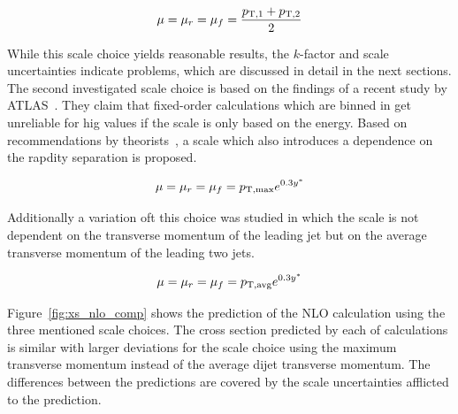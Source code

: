 \begin{equation*}
    \mu = \mu_r = \mu_f = \frac{p_{\mathrm{T},1} + p_{\mathrm{T},2}}{2}
\end{equation*}

While this scale choice yields reasonable results, the $k$-factor and scale
uncertainties indicate problems, which are discussed in detail
in the next sections. The second investigated scale choice is based on the
findings of a recent study by ATLAS~\cite{Aad:2011fc}. They claim that
fixed-order calculations which are binned in \ystar get unreliable for hig
\ystar values if the scale is only based on the energy. Based on recommendations
by theorists~\cite{Ellis:1992en}, a scale which also introduces a dependence on
the rapdity separation is proposed.

\begin{equation*}
    \mu = \mu_r = \mu_f = p_{\mathrm{T,max}} e^{0.3 y^*} 
\end{equation*}

Additionally a variation oft this choice was studied in which the scale is not
dependent on the transverse momentum of the leading jet but on the average
transverse momentum of the leading two jets.

\begin{equation*}
    \mu = \mu_r = \mu_f = p_{\mathrm{T,avg}} e^{0.3 y^*} 
\end{equation*}

Figure~\ref{fig:xs_nlo_comp} shows the prediction of the NLO calculation using
the three mentioned scale choices. The cross section predicted by each of
calculations is similar with larger deviations for the scale choice using the
maximum transverse momentum instead of the average dijet transverse momentum.
The differences between the predictions are covered by the scale uncertainties
afflicted to the prediction.


